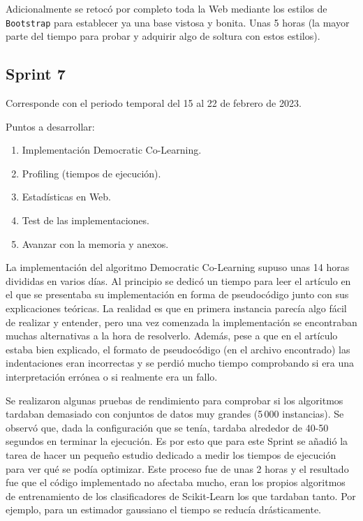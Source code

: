 Adicionalmente se retocó por completo toda la Web mediante los estilos de
\texttt{Bootstrap} para establecer ya una base vistosa y bonita. Unas 5 horas
(la mayor parte del tiempo para probar y adquirir algo de soltura con estos
estilos).

\subsection{Sprint 7}
Corresponde con el periodo temporal del 15 al 22 de febrero de 2023.

Puntos a desarrollar:
\begin{enumerate}
    \item Implementación Democratic Co-Learning.
    \item Profiling (tiempos de ejecución).
    \item Estadísticas en Web.
    \item Test de las implementaciones.
    \item Avanzar con la memoria y anexos.
\end{enumerate}

La implementación del algoritmo Democratic Co-Learning supuso unas 14 horas
divididas en varios días. Al principio se dedicó un tiempo para leer el artículo
en el que se presentaba su implementación en forma de pseudocódigo junto con sus
explicaciones teóricas. La realidad es que en primera instancia parecía algo
fácil de realizar y entender, pero una vez comenzada la implementación se
encontraban muchas alternativas a la hora de resolverlo. Además, pese a que en
el artículo estaba bien explicado, el formato de pseudocódigo (en el archivo
encontrado) las indentaciones eran incorrectas y se perdió mucho tiempo
comprobando si era una interpretación errónea o si realmente era un fallo.

Se realizaron algunas pruebas de rendimiento para comprobar si los algoritmos
tardaban demasiado con conjuntos de datos muy grandes (5\,000 instancias). Se
observó que, dada la configuración que se tenía, tardaba alrededor de 40-50
segundos en terminar la ejecución. Es por esto que para este Sprint se añadió la
tarea de hacer un pequeño estudio dedicado a medir los tiempos de ejecución para
ver qué se podía optimizar. Este proceso fue de unas 2 horas y el resultado fue
que el código implementado no afectaba mucho, eran los propios algoritmos de
entrenamiento de los clasificadores de Scikit-Learn los que tardaban tanto. Por
ejemplo, para un estimador gaussiano el tiempo se reducía drásticamente.

